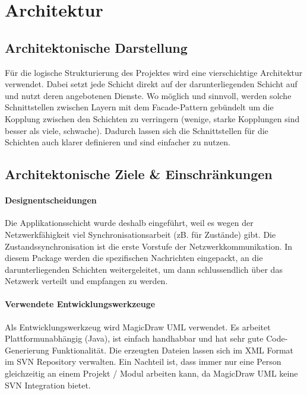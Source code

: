 \documentclass[a4paper,12pt,halfparskip,DIV14]{scrartcl}
\begin{document}


\section{Architektur} %
\label{sec:architektur}
\subsection{Architektonische Darstellung } %
\label{sub:architektonische_darstellung_}
Für die logische Strukturierung des Projektes wird eine vierschichtige Architektur verwendet. Dabei setzt jede Schicht direkt auf der darunterliegenden Schicht auf und nutzt deren angebotenen Dienste. Wo möglich und sinnvoll, werden solche Schnittstellen zwischen Layern mit dem Facade-Pattern gebündelt um die Kopplung zwischen den Schichten zu verringern (wenige, starke Kopplungen sind besser als viele, schwache). Dadurch lassen sich die Schnittstellen für die Schichten auch klarer definieren und sind einfacher zu nutzen.

\subsection{Architektonische Ziele \& Einschränkungen} %
\label{sub:architektonische_ziele_einschränkungen}
\paragraph{Designentscheidungen}\label{ssub:designentscheidungen} %
Die Applikationsschicht wurde deshalb eingeführt, weil es wegen der Netzwerkfähigkeit viel Synchronisationsarbeit (zB. für Zustände) gibt. Die Zustandssynchronisation ist die erste Vorstufe der Netzwerkkommunikation. In diesem Package werden die spezifischen Nachrichten eingepackt, an die darunterliegenden Schichten weitergeleitet, um dann schlussendlich über das Netzwerk verteilt und empfangen zu werden.
\paragraph{Verwendete Entwicklungswerkzeuge}\label{ssub:verwendete_entwicklungswerkzeuge} %
Als Entwicklungswerkzeug wird MagicDraw UML verwendet. Es arbeitet Plattformunabhängig (Java), ist einfach handhabbar und hat sehr gute Code-Generierung Funktionalität. Die erzeugten Dateien lassen sich im XML Format im SVN Repository verwalten. Ein Nachteil ist, dass immer nur eine Person gleichzeitig an einem Projekt / Modul arbeiten kann, da MagicDraw UML keine SVN Integration bietet.
\end{document}
